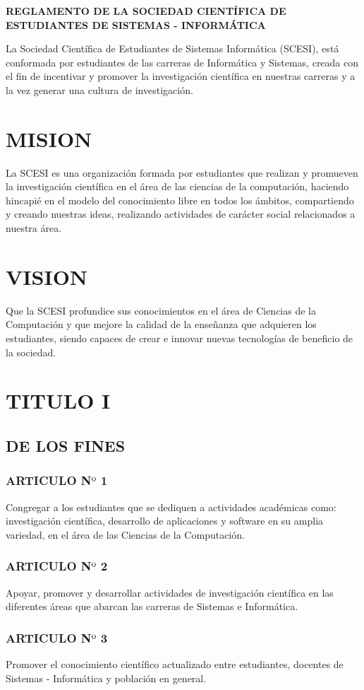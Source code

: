 \documentclass[letterpaper,11pt]{book}
\begin{document}
\begin{center}
{\bf REGLAMENTO DE LA SOCIEDAD CIENTÍFICA DE ESTUDIANTES DE SISTEMAS - INFORMÁTICA}
\end{center}
La Sociedad Científica de Estudiantes de Sistemas Informática (SCESI), está conformada por estudiantes de las carreras de Informática y Sistemas, creada con el fin de incentivar y promover la investigación científica en nuestras carreras y a la vez generar una cultura de investigación.
\section*{MISION}
La SCESI es una organización formada por estudiantes que realizan y promueven la investigación científica en el área de las ciencias de la computación, haciendo hincapié en el modelo del conocimiento libre en todos los ámbitos, compartiendo y creando nuestras ideas, realizando actividades de carácter social relacionados a nuestra área.
\section*{VISION}
Que la SCESI profundice sus conocimientos en el área de Ciencias de la Computación y que mejore la calidad de la enseñanza que adquieren los estudiantes, siendo capaces de crear e innovar nuevas tecnologías de beneficio de la sociedad.

\section*{TITULO I}
\subsection*{DE LOS FINES}
\subsubsection*{ARTICULO N$º$ 1}
Congregar a los estudiantes que se dediquen a actividades académicas como: investigación científica, desarrollo de aplicaciones y software en su amplia variedad, en el área de las Ciencias de la Computación.
\subsubsection*{ARTICULO N$º$ 2}
Apoyar, promover y desarrollar actividades de investigación científica en las diferentes áreas que abarcan las carreras de Sistemas e Informática.
\subsubsection*{ARTICULO N$º$ 3}
Promover el conocimiento científico actualizado entre estudiantes, docentes de Sistemas - Informática y población en general.
\end{document}
